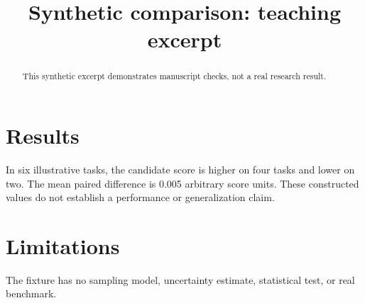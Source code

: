 \documentclass{article}
\title{Synthetic comparison: teaching excerpt}
\begin{document}
\maketitle
\begin{abstract}
This synthetic excerpt demonstrates manuscript checks, not a real research result.
\end{abstract}
\section{Results}
In six illustrative tasks, the candidate score is higher on four tasks and lower on two.
The mean paired difference is 0.005 arbitrary score units.
These constructed values do not establish a performance or generalization claim.
\section{Limitations}
The fixture has no sampling model, uncertainty estimate, statistical test, or real benchmark.
\end{document}
